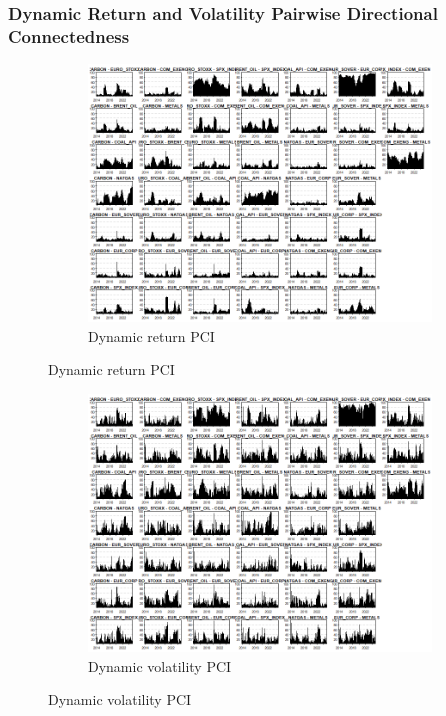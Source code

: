 \documentclass[preprint, 3p,
authoryear]{elsarticle} %
\begin{document}
\begin{landscape}
\newpage

\subsubsection{Dynamic Return and Volatility Pairwise Directional Connectedness}

\begin{figure}[!ht]
  \caption{Dynamic Return and Volatility Pairwise Connectedness Index (Jan 2013 – Jan 2025)}
  \centering
  \begin{subfigure}[a]{\textwidth}
    \caption{Dynamic return PCI}
    \includegraphics[width = 1.1\linewidth]{28aApdxD-12-200-RetPCI}
  \end{subfigure}
\end{figure}
\begin{figure}[!ht]
  \ContinuedFloat
  \centering
    \begin{subfigure}[b]{\textwidth}\ContinuedFloat
      \caption{Dynamic volatility PCI}
      \includegraphics[width = 1.2\linewidth]{28bApdxD-12-200-VolPCI}
    \end{subfigure}
\end{figure}













\end{landscape}
\end{document}
